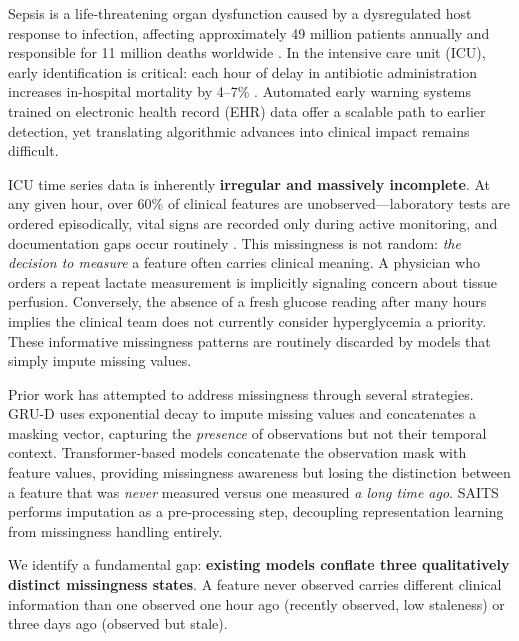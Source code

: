 \documentclass[twoside,11pt]{article}
\begin{document}
Sepsis is a life-threatening organ dysfunction caused by a dysregulated host
response to infection, affecting approximately 49 million patients annually and
responsible for 11 million deaths worldwide \citep{singer2016sepsis3}.  In the
intensive care unit (ICU), early identification is critical: each hour of delay
in antibiotic administration increases in-hospital mortality by
4--7\% \citep{kumar2006antibiotic}.  Automated early warning systems trained on
electronic health record (EHR) data offer a scalable path to earlier detection,
yet translating algorithmic advances into clinical impact remains difficult.

ICU time series data is inherently \textbf{irregular and massively incomplete}.
At any given hour, over 60\% of clinical features are unobserved—laboratory
tests are ordered episodically, vital signs are recorded only during active
monitoring, and documentation gaps occur routinely \citep{che2018gruD}.  This
missingness is not random: \emph{the decision to measure} a feature often
carries clinical meaning.  A physician who orders a repeat lactate measurement
is implicitly signaling concern about tissue perfusion.  Conversely, the absence
of a fresh glucose reading after many hours implies the clinical team does not
currently consider hyperglycemia a priority.  These informative missingness
patterns are routinely discarded by models that simply impute missing values.

Prior work has attempted to address missingness through several strategies.
GRU-D \citep{che2018gruD} uses exponential decay to impute missing values and
concatenates a masking vector, capturing the \emph{presence} of observations
but not their temporal context.  Transformer-based models
\citep{tipirneni2022selfsupervised} concatenate the observation mask with
feature values, providing missingness awareness but losing the distinction
between a feature that was \emph{never} measured versus one measured \emph{a
long time ago}.  SAITS \citep{du2023saits} performs imputation as a
pre-processing step, decoupling representation learning from missingness
handling entirely.

We identify a fundamental gap: \textbf{existing models conflate three
qualitatively distinct missingness states}.  A feature never observed carries
different clinical information than one observed one hour ago (recently
observed, low staleness) or three days ago (observed but stale).
\end{document}
